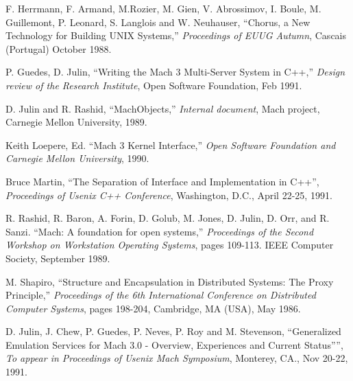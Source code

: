 \begin{thebibliography}{9}

F. Herrmann, F. Armand, M.Rozier, M. Gien, V. Abrossimov, I. Boule, M.
Guillemont, P. Leonard, S. Langlois and W. Neuhauser,
``Chorus, a New Technology for Building UNIX Systems,''
{\em Proceedings of EUUG Autumn}, Cascais (Portugal) October 1988.

P. Guedes, D. Julin, 
``Writing the Mach 3 Multi-Server System in C++,''
{\em Design review of the Research Institute}, Open Software
Foundation, Feb 1991.

D. Julin and R. Rashid,
``MachObjects,''
{\em Internal document}, Mach project, Carnegie Mellon University, 
1989.

Keith Loepere, Ed.
``Mach 3 Kernel Interface,''
{\em Open Software Foundation and Carnegie Mellon University}, 1990.

Bruce Martin,
``The Separation of Interface and Implementation in C++'',
{\em Proceedings of Usenix C++ Conference}, Washington, D.C., April
22-25, 1991.

R. Rashid, R. Baron, A. Forin, D. Golub, M. Jones, D. Julin, D. Orr,
and R. Sanzi. 
``Mach: A foundation for open systems,''
{\em Proceedings of the Second Workshop on Workstation Operating
Systems}, pages 109-113. IEEE Computer Society, September 1989.

M. Shapiro,
``Structure and Encapsulation in Distributed Systems: The Proxy
Principle,''
{\em Proceedings of the 6th International Conference on Distributed
Computer Systems}, pages 198-204, Cambridge, MA (USA), May 1986.

D. Julin, J. Chew, P. Guedes, P. Neves, P. Roy and M. Stevenson,
``Generalized Emulation Services for Mach 3.0 - Overview, Experiences
and Current Status'''',
{\em To appear in Proceedings of Usenix Mach Symposium}, Monterey,
CA., Nov 20-22, 1991.

\end{thebibliography}



